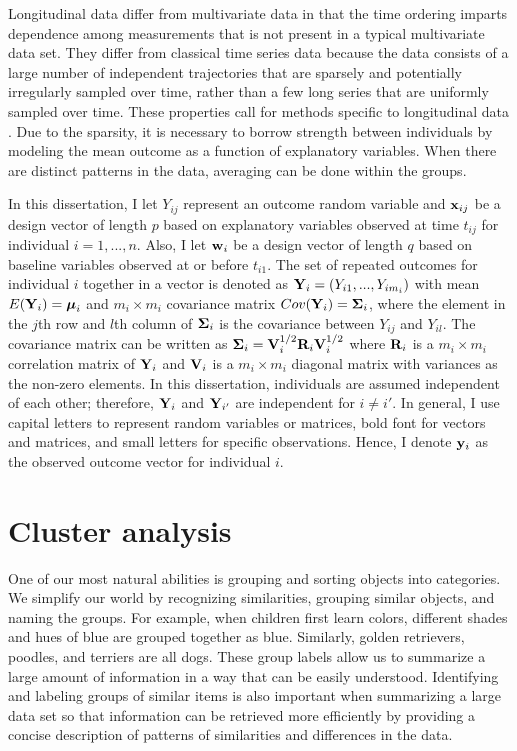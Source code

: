 Longitudinal data differ from multivariate data in that the time ordering imparts dependence among measurements that is not present in a typical multivariate data set. They differ from classical time series data because the data consists of a large number of independent trajectories that are sparsely and potentially irregularly sampled over time, rather than a few long series that are uniformly sampled over time. These properties call for methods specific to longitudinal data \cite{diggle2002}. Due to the sparsity, it is necessary to borrow strength between individuals by modeling the mean outcome as a function of explanatory variables. When there are distinct patterns in the data, averaging can be done within the groups.

In this dissertation, I let $Y_{ij}$ represent an outcome random variable and $\mathbf x_{ij}$ be a design vector of length $p$ based on explanatory variables observed at time $t_{ij}$ for individual $i=1,...,n$. Also, I let $\mathbf w_{i}$ be a design vector of length $q$ based on baseline variables observed at or before $t_{i1}$. The set of repeated outcomes for individual $i$ together in a vector is denoted as $\mathbf Y_{i} = (Y_{i1},...,Y_{im_{i}})$ with mean $E(\mathbf Y_{i}) = \boldsymbol\mu_{i}$ and $m_{i}\times m_{i}$ covariance matrix $Cov(\mathbf Y_{i}) = \boldsymbol\Sigma_{i}$, where the element in the $j$th row and $l$th column of $\boldsymbol\Sigma_{i}$ is the covariance between $Y_{ij}$ and $Y_{il}$. The covariance matrix can be written as $\boldsymbol\Sigma_{i}=\mathbf V_{i}^{1/2}\mathbf R_{i}\mathbf V_{i}^{1/2}$ where $\mathbf R_{i}$ is a $m_{i}\times m_{i}$ correlation matrix of $\mathbf Y_{i}$ and $\mathbf V_{i}$ is a $m_{i}\times m_{i}$ diagonal matrix with variances as the non-zero elements. In this dissertation, individuals are assumed independent of each other; therefore, $\mathbf Y_{i}$ and $\mathbf Y_{i'}$ are independent for $i\not = i'$. In general, I use capital letters to represent random variables or matrices, bold font for vectors and matrices, and small letters for specific observations. Hence, I denote $\mathbf y_{i}$ as the observed outcome vector for individual $i$. 

\section{Cluster analysis}
One of our most natural abilities is grouping and sorting objects into categories. We simplify our world by recognizing similarities, grouping similar objects, and naming the groups. For example, when children first learn colors, different shades and hues of blue are grouped together as blue. Similarly, golden retrievers, poodles, and terriers are all dogs. These group labels allow us to summarize a large amount of information in a way that can be easily understood. Identifying and labeling groups of similar items is also important when summarizing a large data set so that information can be retrieved more efficiently by providing a concise description of patterns of similarities and differences in the data. 

